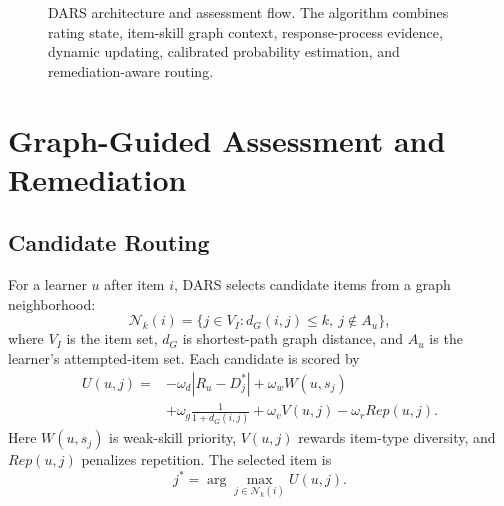 \documentclass[conference]{IEEEtran}
\begin{document}
\begin{figure}[t]
{}
\caption{DARS architecture and assessment flow. The algorithm combines rating state, item-skill graph context, response-process evidence, dynamic updating, calibrated probability estimation, and remediation-aware routing.}
\label{fig:dars-flow}
\end{figure}

\section{Graph-Guided Assessment and Remediation}
\subsection{Candidate Routing}
For a learner $u$ after item $i$, DARS selects candidate items from a graph neighborhood:
\begin{equation}
\mathcal{N}_k(i)=\{j\in V_I:d_G(i,j)\leq k,\ j\notin A_u\},
\end{equation}
where $V_I$ is the item set, $d_G$ is shortest-path graph distance, and $A_u$ is the learner's attempted-item set. Each candidate is scored by
\begin{align}
U(u,j)=&-\omega_d\left|R_u-D_j^\ast\right|
+\omega_w W(u,s_j) \nonumber\\
&+\omega_g\frac{1}{1+d_G(i,j)}
+\omega_v V(u,j)-\omega_r Rep(u,j).
\end{align}
Here $W(u,s_j)$ is weak-skill priority, $V(u,j)$ rewards item-type diversity, and $Rep(u,j)$ penalizes repetition. The selected item is
\begin{equation}
j^\ast=\arg\max_{j\in \mathcal{N}_k(i)}U(u,j).
\end{equation}
\end{document}
